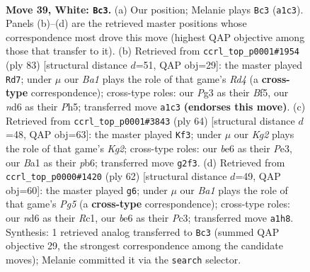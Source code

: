 \documentclass[11pt]{article}
\begin{document}
\clearpage

\begin{figure}[p]\centering
\begin{subfigure}{0.46\textwidth}\centering
\resizebox{\linewidth}{!}{%
\newchessgame
\chessboard[
  setfen={1r3k2/2R4p/3nb3/1p4p1/r7/4P1P1/P4PKP/B3R3 w - - 2 39},
  showmover=false,
  pgfstyle=straightmove, color=movearrow, markmove={a1-c3}
]}
\caption{}
\end{subfigure}\hfill
\begin{subfigure}{0.46\textwidth}\centering
\resizebox{\linewidth}{!}{%
\newchessgame
\chessboard[
  setfen={8/1pR2pk1/1P4p1/3r1b1p/7P/r3P1P1/1R5K/5B2 b - - 1 42},
  showmover=false,
  pgfstyle=straightmove, color=movearrow, markmove={d5-d7}
]}
\caption{}
\end{subfigure}
\\[4pt]
\begin{subfigure}{0.46\textwidth}\centering
\resizebox{\linewidth}{!}{%
\newchessgame
\chessboard[
  setfen={2r2k2/8/1p3p2/7p/1P1R4/2p1P1P1/1r3PKP/2R5 w - - 0 33},
  showmover=false,
  pgfstyle=straightmove, color=movearrow, markmove={g2-f3}
]}
\caption{}
\end{subfigure}\hfill
\begin{subfigure}{0.46\textwidth}\centering
\resizebox{\linewidth}{!}{%
\newchessgame
\chessboard[
  setfen={1r3k2/5p2/p7/1p1p1RPp/4r2P/P1P5/1P6/1KR5 w - - 1 32},
  showmover=false,
  pgfstyle=straightmove, color=movearrow, markmove={g5-g6}
]}
\caption{}
\end{subfigure}
\caption{\textbf{Move 39, White: \texttt{Bc3}.} (a) Our position; Melanie plays \texttt{Bc3} (\texttt{a1c3}). Panels (b)--(d) are the retrieved master positions whose correspondence most drove this move (highest QAP objective among those that transfer to it). (b) Retrieved from \texttt{ccrl\_top\_p0001\#1954} (ply 83) [structural distance $d$=51, QAP obj=29]: the master played \texttt{Rd7}; under $\mu$ our \emph{Ba1} plays the role of that game's \emph{Rd4} (a \textbf{cross-type} correspondence); cross-type roles: our \emph{P}g3 as their \emph{B}f5, our \emph{n}d6 as their \emph{P}h5; transferred move \texttt{a1c3} \textbf{(endorses this move)}. (c) Retrieved from \texttt{ccrl\_top\_p0001\#3843} (ply 64) [structural distance $d$=48, QAP obj=63]: the master played \texttt{Kf3}; under $\mu$ our \emph{Kg2} plays the role of that game's \emph{Kg2}; cross-type roles: our \emph{b}e6 as their \emph{P}e3, our \emph{B}a1 as their \emph{p}b6; transferred move \texttt{g2f3}. (d) Retrieved from \texttt{ccrl\_top\_p0000\#1420} (ply 62) [structural distance $d$=49, QAP obj=60]: the master played \texttt{g6}; under $\mu$ our \emph{Ba1} plays the role of that game's \emph{Pg5} (a \textbf{cross-type} correspondence); cross-type roles: our \emph{n}d6 as their \emph{R}c1, our \emph{b}e6 as their \emph{P}c3; transferred move \texttt{a1h8}. Synthesis: 1 retrieved analog transferred to \texttt{Bc3} (summed QAP objective 29, the strongest correspondence among the candidate moves); Melanie committed it via the \texttt{search} selector.}
\label{fig:thought-m76}
\end{figure}
\end{document}
